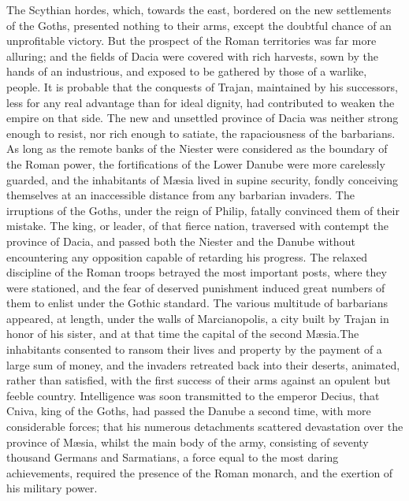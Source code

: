 The Scythian hordes, which, towards the east, bordered on the new
settlements of the Goths, presented nothing to their arms, except
the doubtful chance of an unprofitable victory. But the prospect
of the Roman territories was far more alluring; and the fields of
Dacia were covered with rich harvests, sown by the hands of an
industrious, and exposed to be gathered by those of a warlike,
people. It is probable that the conquests of Trajan, maintained
by his successors, less for any real advantage than for ideal
dignity, had contributed to weaken the empire on that side. The
new and unsettled province of Dacia was neither strong enough to
resist, nor rich enough to satiate, the rapaciousness of the
barbarians. As long as the remote banks of the Niester were
considered as the boundary of the Roman power, the fortifications
of the Lower Danube were more carelessly guarded, and the
inhabitants of Mæsia lived in supine security, fondly conceiving
themselves at an inaccessible distance from any barbarian
invaders. The irruptions of the Goths, under the reign of Philip,
fatally convinced them of their mistake. The king, or leader, of
that fierce nation, traversed with contempt the province of
Dacia, and passed both the Niester and the Danube without
encountering any opposition capable of retarding his progress.
The relaxed discipline of the Roman troops betrayed the most
important posts, where they were stationed, and the fear of
deserved punishment induced great numbers of them to enlist under
the Gothic standard. The various multitude of barbarians
appeared, at length, under the walls of Marcianopolis, a city
built by Trajan in honor of his sister, and at that time the
capital of the second Mæsia.\footnotemark[29] The inhabitants consented to
ransom their lives and property by the payment of a large sum of
money, and the invaders retreated back into their deserts,
animated, rather than satisfied, with the first success of their
arms against an opulent but feeble country. Intelligence was soon
transmitted to the emperor Decius, that Cniva, king of the Goths,
had passed the Danube a second time, with more considerable
forces; that his numerous detachments scattered devastation over
the province of Mæsia, whilst the main body of the army,
consisting of seventy thousand Germans and Sarmatians, a force
equal to the most daring achievements, required the presence of
the Roman monarch, and the exertion of his military power.


